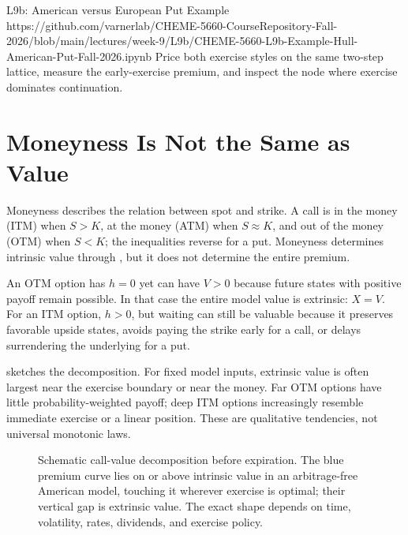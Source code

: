 \documentclass[11pt]{article}
\begin{document}
\notebooklink
  {L9b: American versus European Put Example}
  {https://github.com/varnerlab/CHEME-5660-CourseRepository-Fall-2026/blob/main/lectures/week-9/L9b/CHEME-5660-L9b-Example-Hull-American-Put-Fall-2026.ipynb}
  {Price both exercise styles on the same two-step lattice, measure the early-exercise premium, and inspect the node where exercise dominates continuation.}

\section{Moneyness Is Not the Same as Value}

Moneyness describes the relation between spot and strike. A call is in the money (ITM) when $S>K$, at the money (ATM) when $S\approx K$, and out of the money (OTM) when $S<K$; the inequalities reverse for a put. Moneyness determines intrinsic value through , but it does not determine the entire premium.

An OTM option has $h=0$ yet can have $V>0$ because future states with positive payoff remain possible. In that case the entire model value is extrinsic: $X=V$. For an ITM option, $h>0$, but waiting can still be valuable because it preserves favorable upside states, avoids paying the strike early for a call, or delays surrendering the underlying for a put.

 sketches the decomposition. For fixed model inputs, extrinsic value is often largest near the exercise boundary or near the money. Far OTM options have little probability-weighted payoff; deep ITM options increasingly resemble immediate exercise or a linear position. These are qualitative tendencies, not universal monotonic laws.

\begin{figure}[ht]
  \centering
  \caption{Schematic call-value decomposition before expiration. The blue premium curve lies on or above intrinsic value in an arbitrage-free American model, touching it wherever exercise is optimal; their vertical gap is extrinsic value. The exact shape depends on time, volatility, rates, dividends, and exercise policy.}
  \label{fig:value-decomposition}
\end{figure}
\end{document}
